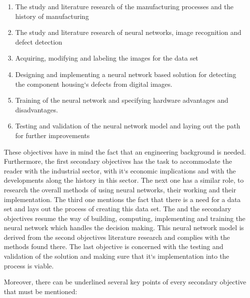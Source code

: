 \documentclass[12pt,a4paper,twoside]{report}
\begin{document}
\begin{enumerate}
    \item The study and literature research of the manufacturing processes and the history of manufacturing
    \item The study and literature research of neural networks, image recognition and defect detection
    \item Acquiring, modifying and labeling the images for the data set
    \item Designing and implementing a neural network based solution for detecting the component housing`s defects from digital images.
    \item Training of the neural network and specifying hardware advantages and disadvantages.
    \item Testing and validation of the neural network model and laying out the path for further improvements

\end{enumerate}

These objectives have in mind the fact that an engineering background is needed. Furthermore, the first secondary objectives has the task to accommodate the reader with the industrial sector, with it`s economic implications and with the developments along the history in this sector. The next one has a similar role, to research the overall methods of using neural networks, their working and their implementation. The third one mentions the fact that there is a need for a data set and lays out the process of creating this data set. The  and the  secondary objectives resume the way of building, computing, implementing and training the neural network which handles the decision making. This neural network model is derived from the second objectives literature research and complies with the methods found there. The last objective is concerned with the testing and validation of the solution and making sure that it`s implementation into the process is viable.\par
Moreover, there can be underlined several key points of every secondary objective that must be mentioned:
\end{document}
